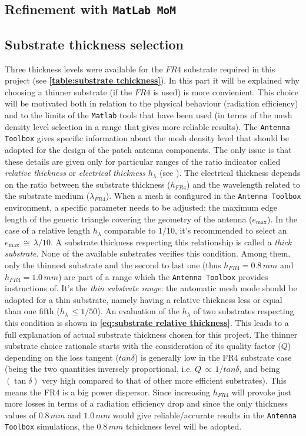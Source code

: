 \documentclass[12pt,a4paper]{article}
\begin{document}
{\begin{multicols}{2}
\subsection*{Refinement with \texttt{\color{BurntOrange}MatLab MoM}}
\subsection*{Substrate thickness selection}Three thickness levels were available for the $FR4$ substrate required in this project (see \textbf{\cref{table:substrate tchickness}}). In this part it will be explained why choosing a thinner substrate (if the $FR4$ is used) is more convienient. This choice will be motivated both in relation to the physical behaviour (radiation efficiency) and to the limits of the \texttt{\color{BurntOrange}Matlab} tools that have been used (in terms of the mesh density level selection in a range that gives more reliable results). \FloatBarrier
The \texttt{\color{Mahogany}Antenna Toolbox} gives specific
information about the mesh density level that should be adopted for the design of the patch antenna components. The only issue is that these details are given only for particular ranges of the ratio indicator called \emph{relative thickness} or \emph{electrical thickness} $h_{\lambda}$ (see \textbf{\cite{makarov}}). The electrical thickness depends on the ratio between the substrate thickness ($h_{FR4}$) and the wavelength related to the substrate medium ($\lambda_{FR4}$). When a mesh is configured in the \texttt{\color{Mahogany}Antenna Toolbox} environment, a specific parameter needs to be adjusted: the maximum edge length of the generic triangle covering the geometry of the antenna ($e_{\max}$). In the case of a relative length $h_\lambda$ comparable to $1/10$, it's recommended to select an $e_{\max}\,\cong\,\lambda/10$. A substrate thickness respecting this relationship is called a \emph{thick substrate}. None of the available substrates verifies this condition. Among them, only the thinnest substrate and the second to last one (thus $h_{FR4}=0.8\,mm$ and $h_{FR4}=1.0\,mm$) are part of a range which the \texttt{\color{Mahogany}Antenna Toolbox} provides instructions of. It's the \emph{thin substrate range}: the automatic mesh mode should be adopted for a thin substrate, namely having a relative thickness less or equal than one fifth ($h_\lambda\,\leq{1/50}$). An evaluation of the $h_\lambda$ of two substrates respecting this condition is shown in \textbf{\cref{eq:substrate relative thickness}}. This leads to a full explanation of actual substrate thickness chosen for this project. The thinner substrate choice rationale starts with the consideration of its quality factor ($Q$) depending on the loss tangent ($tan\delta$) is generally low in the FR4 substrate case (being the two quantities inversely proportional, i.e. $Q\,\propto\,1/tan\delta$, and being $(\tan\delta)$ very high compared to that of other more efficient substrates). This means the FR4 is a big power dispersor. Since increasing $h_{FR4}$ will provoke just more losses in terms of a radiation efficiency drop and since the only thickness values of $0.8\,mm$ and $1.0\,mm$ would give reliable/accurate results in the \texttt{\color{Mahogany}Antenna Toolbox} simulations, the $0.8\,mm$ tchickness level will be adopted. 

\end{multicols}}
\end{document}
